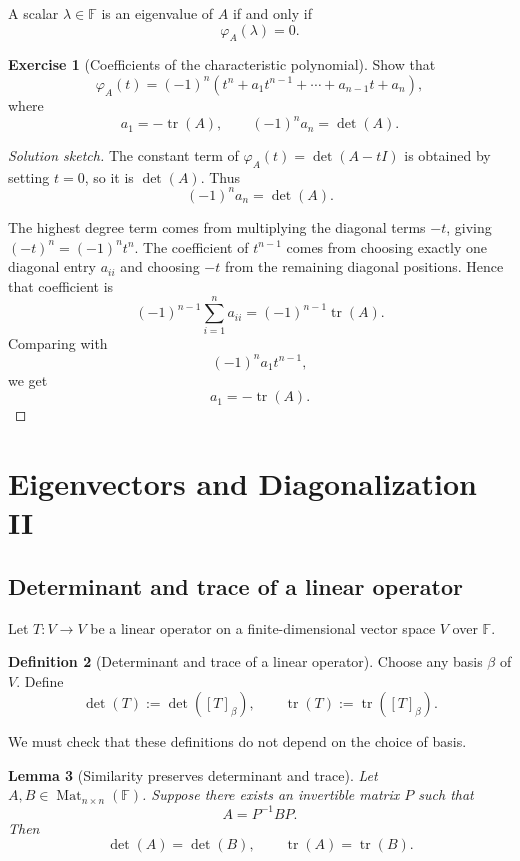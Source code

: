 \documentclass[11pt]{article}
\newcommand{\F}{\mathbb F}
\newcommand{\Mat}{\operatorname{Mat}}
\newcommand{\tr}{\operatorname{tr}}
\theoremstyle{definition}
\newtheorem{definition}{Definition}[section]
\newtheorem{exercise}[definition]{Exercise}
\theoremstyle{plain}
\newtheorem{lemma}[definition]{Lemma}
\begin{document}
A scalar $\lambda\in\F$ is an eigenvalue of $A$ if and only if
\[
\varphi_A(\lambda)=0.
\]

\begin{exercise}[Coefficients of the characteristic polynomial]
Show that
\[
\varphi_A(t)=(-1)^n\left(t^n+a_1t^{n-1}+\cdots+a_{n-1}t+a_n\right),
\]
where
\[
a_1=-\tr(A),
\qquad
(-1)^n a_n=\det(A).
\]
\end{exercise}

\begin{proof}[Solution sketch]
The constant term of $\varphi_A(t)=\det(A-tI)$ is obtained by setting $t=0$, so it is $\det(A)$.  Thus
\[
(-1)^n a_n=\det(A).
\]

The highest degree term comes from multiplying the diagonal terms $-t$, giving $(-t)^n=(-1)^n t^n$.  The coefficient of $t^{n-1}$ comes from choosing exactly one diagonal entry $a_{ii}$ and choosing $-t$ from the remaining diagonal positions.  Hence that coefficient is
\[
(-1)^{n-1}\sum_{i=1}^n a_{ii}=(-1)^{n-1}\tr(A).
\]
Comparing with
\[
(-1)^n a_1 t^{n-1},
\]
we get
\[
a_1=-\tr(A).
\]
\end{proof}

\section{Eigenvectors and Diagonalization II}

\subsection{Determinant and trace of a linear operator}

Let $T:V\to V$ be a linear operator on a finite-dimensional vector space $V$ over $\F$.

\begin{definition}[Determinant and trace of a linear operator]
Choose any basis $\beta$ of $V$.  Define
\[
\det(T):=\det([T]_{\beta}),
\qquad
\tr(T):=\tr([T]_{\beta}).
\]
\end{definition}

We must check that these definitions do not depend on the choice of basis.

\begin{lemma}[Similarity preserves determinant and trace]
Let $A,B\in\Mat_{n\times n}(\F)$.  Suppose there exists an invertible matrix $P$ such that
\[
A=P^{-1}BP.
\]
Then
\[
\det(A)=\det(B),
\qquad
\tr(A)=\tr(B).
\]
\end{lemma}
\end{document}
